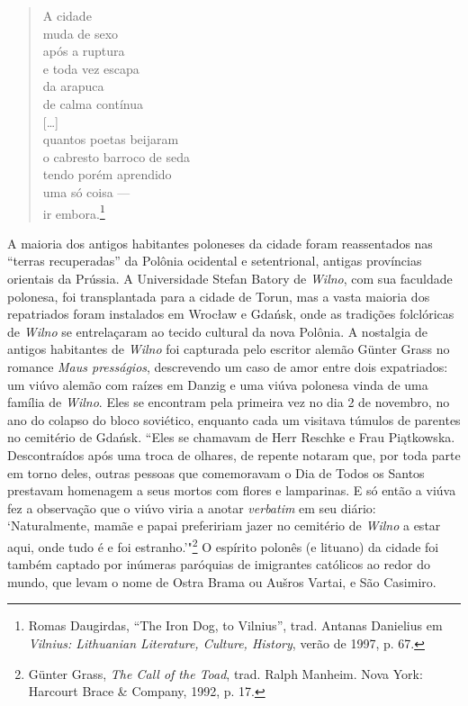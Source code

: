 \begin{verse}
A cidade\\
muda de sexo\\
após a ruptura\\
e toda vez escapa\\
da arapuca\\
de calma contínua\\
\smallskip
{[}\ldots{}{]}\\
\smallskip
quantos poetas beijaram\\
o cabresto barroco de seda\\
tendo porém aprendido\\
uma só coisa ---\\
ir embora.\footnote{Romas Daugirdas, ``The Iron Dog, to Vilnius'', trad. Antanas Danielius em \textit{Vilnius: Lithuanian Literature, Culture, History}, verão de 1997, p. 67.} 
\end{verse}

A maioria dos antigos habitantes poloneses da cidade foram reassentados
nas ``terras recuperadas'' da Polônia ocidental e setentrional, antigas
províncias orientais da Prússia. A Universidade Stefan Batory de \textit{Wilno},
com sua faculdade polonesa, foi transplantada para a cidade de Torun,
mas a vasta maioria dos repatriados foram instalados em Wrocław e
Gdańsk, onde as tradições folclóricas de \textit{Wilno} se entrelaçaram ao tecido
cultural da nova Polônia. A nostalgia de antigos habitantes de \textit{Wilno} foi
capturada pelo escritor alemão Günter Grass no romance \textit{Maus
presságios}, descrevendo um caso de amor entre dois expatriados: um
viúvo alemão com raízes em Danzig e uma viúva polonesa vinda de uma
família de \textit{Wilno}. Eles se encontram pela primeira vez no dia 2 de
novembro, no ano do colapso do bloco soviético, enquanto cada um
visitava túmulos de parentes no cemitério de Gdańsk. ``Eles se chamavam
de Herr Reschke e Frau Piątkowska. Descontraídos após uma troca de
olhares, de repente notaram que, por toda parte em torno deles, outras
pessoas que comemoravam o Dia de Todos os Santos prestavam homenagem a
seus mortos com flores e lamparinas. E só então a viúva fez a observação
que o viúvo viria a anotar \textit{verbatim} em seu diário: `Naturalmente,
mamãe e papai prefeririam jazer no cemitério de \textit{Wilno} a estar aqui, onde
tudo é e foi estranho.'"\footnote{Günter Grass, \textit{The Call of the Toad}, trad. Ralph Manheim. Nova York: Harcourt Brace \& Company, 1992, p. 17.} O espírito polonês (e lituano) da cidade foi também captado por inúmeras paróquias de imigrantes católicos ao redor do mundo, que
levam o nome de Ostra Brama ou Aušros Vartai, e São Casimiro.

